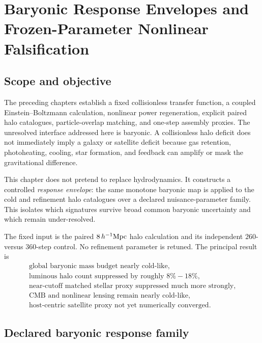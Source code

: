 \chapter[Baryonic Response and Nonlinear Falsification]{Baryonic Response Envelopes and Frozen-Parameter Nonlinear Falsification}
\label{ch:baryonic-response-falsification}

\section{Scope and objective}

The preceding chapters establish a fixed collisionless transfer function, a coupled Einstein--Boltzmann calculation, nonlinear power regeneration, explicit paired halo catalogues, particle-overlap matching, and one-step assembly proxies.  The unresolved interface addressed here is baryonic.  A collisionless halo deficit does not immediately imply a galaxy or satellite deficit because gas retention, photoheating, cooling, star formation, and feedback can amplify or mask the gravitational difference.

This chapter does not pretend to replace hydrodynamics.  It constructs a controlled \emph{response envelope}: the same monotone baryonic map is applied to the cold and refinement halo catalogues over a declared nuisance-parameter family.  This isolates which signatures survive broad common baryonic uncertainty and which remain under-resolved.

The fixed input is the paired $8\,h^{-1}{\rm Mpc}$ halo calculation and its independent $260$- versus $360$-step control.  No refinement parameter is retuned.  The principal result is
\begin{equation}
\boxed{
\begin{gathered}
\text{global baryonic mass budget nearly cold-like},\\
\text{luminous halo count suppressed by roughly }8\%-18\%,\\
\text{near-cutoff matched stellar proxy suppressed much more strongly},\\
\text{CMB and nonlinear lensing remain nearly cold-like},\\
\text{host-centric satellite proxy not yet numerically converged}.
\end{gathered}}
\label{eq:brf-principal-result}
\end{equation}

\section{Declared baryonic response family}

